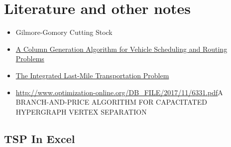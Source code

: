 \section{Literature and other notes}


\begin{itemize}
\item Gilmore-Gomory Cutting Stock~\cite{Gilmore-Gomory}
\item \href{http://www.optimization-online.org/DB_HTML/2018/06/6648.html}{A Column Generation Algorithm for Vehicle Scheduling and Routing Problems}
\item \href{http://www.optimization-online.org/DB_HTML/2018/06/6670.html}{The Integrated Last-Mile Transportation Problem}
\item \url{http://www.optimization-online.org/DB_FILE/2017/11/6331.pdf}{A BRANCH-AND-PRICE ALGORITHM FOR CAPACITATED
HYPERGRAPH VERTEX SEPARATION}
\end{itemize}




\subsection{TSP In Excel}



%

